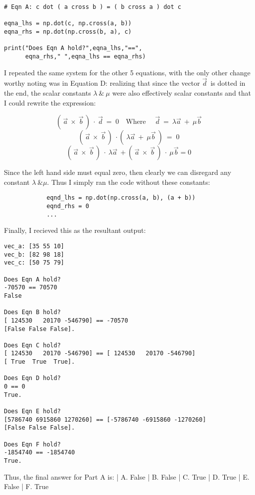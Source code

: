\documentclass[12pt,letterpaper, onecolumn]{exam}
\begin{document}
\begin{questions}
\begin{solution}
        \begin{lstlisting}
# Eqn A: c dot ( a cross b ) = ( b cross a ) dot c

eqna_lhs = np.dot(c, np.cross(a, b))
eqna_rhs = np.dot(np.cross(b, a), c)

print("Does Eqn A hold?",eqna_lhs,"==",
      eqna_rhs," ",eqna_lhs == eqna_rhs)
        \end{lstlisting}


         I repeated the same system for the other 5 equations, with the only other change worthy noting was in Equation D: realizing that since the vector $\vec{d}\,$ is dotted in the end, the scalar constants $\lambda\ 
          \&\ \mu$ were also effectively scalar constants and that I could rewrite the expression:
        
         \begin{equation}
                    (\,\vec{a}\ \times\ \vec{b}\,)\ \cdot \ \vec{d}\ = \;0
                    \quad\text{Where }\quad \vec{d}\ =\ \lambda \vec{a} \ + \ \mu \vec{b}
                \end{equation}
        \begin{equation}
            (\,\vec{a}\ \times\ \vec{b}\,)\ \cdot (\ \lambda \vec{a} \ + \ \mu \vec{b}\ )\ = \;0
        \end{equation}
        \begin{equation}
            (\,\vec{a}\ \times\ \vec{b}\,)\ \cdot \ \lambda \vec{a} \ + (\,\vec{a}\ \times\ \vec{b}\,)\ \cdot \ \mu \vec{b}=0
        \end{equation}

        Since the left hand side must equal zero, then clearly we can disregard any constant $\lambda\ \& \mu$. Thus I simply ran the code without these constants:
        \begin{lstlisting}
            eqnd_lhs = np.dot(np.cross(a, b), (a + b)) 
            eqnd_rhs = 0
            ...
        \end{lstlisting}

        Finally, I recieved this as the resultant output:
        \begin{lstlisting}
vec_a: [35 55 10]
vec_b: [82 98 18]
vec_c: [50 75 79]

Does Eqn A hold? 
-70570 == 70570   
False

Does Eqn B hold? 
[ 124530   20170 -546790] == -70570  
[False False False].

Does Eqn C hold? 
[ 124530   20170 -546790] == [ 124530   20170 -546790]   
[ True  True  True].

Does Eqn D hold? 
0 == 0   
True.

Does Eqn E hold? 
[5786740 6915860 1270260] == [-5786740 -6915860 -1270260]   
[False False False].

Does Eqn F hold? 
-1854740 == -1854740   
True.

        \end{lstlisting}
Thus, the final answer for Part A is:\newline
| A. False 
| B. False 
| C. True 
| D. True 
| E. False 
| F. True
    \end{solution}
\end{questions}
\end{document}
